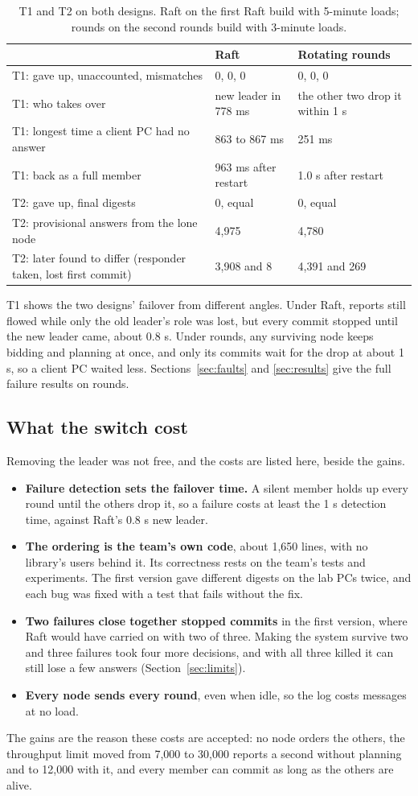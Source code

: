 \begin{table}[!htb]
\centering\small
\caption{T1 and T2 on both designs. Raft on the first Raft build with 5-minute loads; rounds on the second rounds build with 3-minute loads.}
\label{tab:t1t2}
\begin{tabularx}{\linewidth}{@{}P{4.2cm}LL@{}}
\toprule
 & Raft & Rotating rounds \\
\midrule
T1: gave up, unaccounted, mismatches & 0, 0, 0 & 0, 0, 0 \\
T1: who takes over & new leader in 778 ms & the other two drop it within 1 s \\
T1: longest time a client PC had no answer & 863 to 867 ms & 251 ms \\
T1: back as a full member & 963 ms after restart & 1.0 s after restart \\
T2: gave up, final digests & 0, equal & 0, equal \\
T2: provisional answers from the lone node & 4,975 & 4,780 \\
T2: later found to differ (responder taken, lost first commit) & 3,908 and 8 & 4,391 and 269 \\
\bottomrule
\end{tabularx}
\end{table}

T1 shows the two designs' failover from different angles. Under Raft, reports still flowed while only the old leader's role was lost, but every commit stopped until the new leader came, about 0.8 s. Under rounds, any surviving node keeps bidding and planning at once, and only its commits wait for the drop at about 1 s, so a client PC waited less. Sections~\ref{sec:faults} and \ref{sec:results} give the full failure results on rounds.

\subsection{What the switch cost}

Removing the leader was not free, and the costs are listed here, beside the gains.

\begin{itemize}
  \item \textbf{Failure detection sets the failover time.} A silent member holds up every round until the others drop it, so a failure costs at least the 1 s detection time, against Raft's 0.8 s new leader.
  \item \textbf{The ordering is the team's own code}, about 1,650 lines, with no library's users behind it. Its correctness rests on the team's tests and experiments. The first version gave different digests on the lab PCs twice, and each bug was fixed with a test that fails without the fix.
  \item \textbf{Two failures close together stopped commits} in the first version, where Raft would have carried on with two of three. Making the system survive two and three failures took four more decisions, and with all three killed it can still lose a few answers (Section~\ref{sec:limits}).
  \item \textbf{Every node sends every round}, even when idle, so the log costs messages at no load.
\end{itemize}

The gains are the reason these costs are accepted: no node orders the others, the throughput limit moved from 7,000 to 30,000 reports a second without planning and to 12,000 with it, and every member can commit as long as the others are alive.
